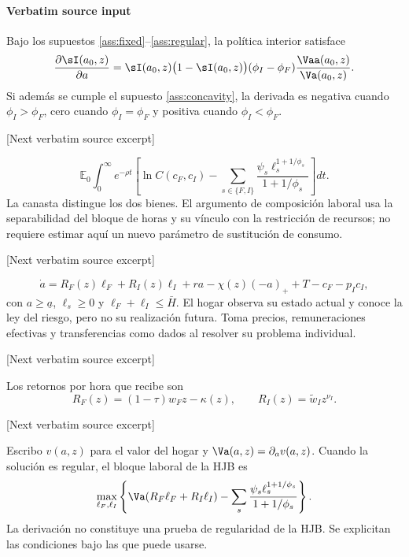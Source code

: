 \documentclass[10pt]{article}
\begin{document}
\paragraph{Verbatim source input}
\begin{ReviewVerbatim}
\begin{proposition}\label{prop:composition}
Bajo los supuestos \ref{ass:fixed}--\ref{ass:regular}, la política interior satisface
\begin{equation}\label{eq:main}
\frac{\partial\sI(a_0,z)}{\partial a}
=\sI(a_0,z)\bigl(1-\sI(a_0,z)\bigr)
(\phi_I-\phi_F)\frac{\Vaa(a_0,z)}{\Va(a_0,z)} .
\end{equation}
Si además se cumple el supuesto \ref{ass:concavity}, la derivada es negativa cuando \(\phi_I>\phi_F\), cero cuando \(\phi_I=\phi_F\) y positiva cuando \(\phi_I<\phi_F\).
\end{proposition}

[Next verbatim source excerpt]

\begin{equation}\label{eq:preferences}
\mathbb E_0\int_0^\infty e^{-\rho t}
\left[\ln C(c_F,c_I)-
\sum_{s\in\{F,I\}}\frac{\psi_s\ell_s^{1+1/\phi_s}}{1+1/\phi_s}\right]dt.
\end{equation}
La canasta distingue los dos bienes. El argumento de composición laboral usa la separabilidad del bloque de horas y su vínculo con la restricción de recursos; no requiere estimar aquí un nuevo parámetro de sustitución de consumo.

[Next verbatim source excerpt]

\begin{equation}\label{eq:budget}
\dot a=R_F(z)\ell_F+R_I(z)\ell_I+ra-\chi(z)(-a)_+
+T-c_F-p_Ic_I,
\end{equation}
con \(a\geq\underline a\), \(\ell_s\geq0\) y
\(\ell_F+\ell_I\leq\bar H\). El hogar observa su estado actual y conoce la ley del riesgo, pero no su realización futura. Toma precios, remuneraciones efectivas y transferencias como dados al resolver su problema individual.

[Next verbatim source excerpt]

Los retornos por hora que recibe son
\begin{equation}\label{eq:returns}
R_F(z)=(1-\tau)w_Fz-\kappa(z),\qquad
R_I(z)=\widetilde w_Iz^{\nu_I}.
\end{equation}

[Next verbatim source excerpt]

Escribo \(v(a,z)\) para el valor del hogar y \(\Va(a,z)=\partial_av(a,z)\). Cuando la solución es regular, el bloque laboral de la HJB es
\begin{equation}\label{eq:hoursblock}
\max_{\ell_F,\ell_I}
\left\{\Va(R_F\ell_F+R_I\ell_I)-
\sum_s\frac{\psi_s\ell_s^{1+1/\phi_s}}{1+1/\phi_s}\right\}.
\end{equation}
La derivación no constituye una prueba de regularidad de la HJB. Se explicitan las condiciones bajo las que puede usarse.


\end{ReviewVerbatim}
\end{document}
